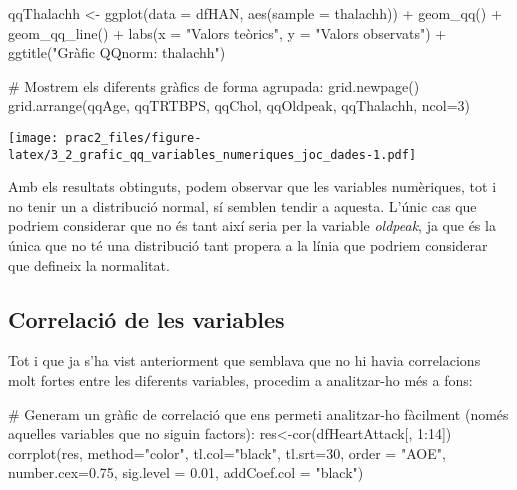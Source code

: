 \documentclass[
]{article}
\newenvironment{Shaded}{\begin{snugshade}}{\end{snugshade}}
\newcommand{\AttributeTok}[1]{\textcolor[rgb]{0.80,0.80,0.80}{#1}}
\newcommand{\CommentTok}[1]{\textcolor[rgb]{0.50,0.62,0.50}{#1}}
\newcommand{\DecValTok}[1]{\textcolor[rgb]{0.86,0.86,0.80}{#1}}
\newcommand{\FloatTok}[1]{\textcolor[rgb]{0.75,0.75,0.82}{#1}}
\newcommand{\FunctionTok}[1]{\textcolor[rgb]{0.94,0.94,0.56}{#1}}
\newcommand{\NormalTok}[1]{\textcolor[rgb]{0.80,0.80,0.80}{#1}}
\newcommand{\OtherTok}[1]{\textcolor[rgb]{0.94,0.94,0.56}{#1}}
\newcommand{\SpecialCharTok}[1]{\textcolor[rgb]{0.86,0.64,0.64}{#1}}
\newcommand{\StringTok}[1]{\textcolor[rgb]{0.80,0.58,0.58}{#1}}
\begin{document}
\begin{Shaded}
\begin{Highlighting}[]
\NormalTok{qqThalachh }\OtherTok{\textless{}{-}} \FunctionTok{ggplot}\NormalTok{(}\AttributeTok{data =}\NormalTok{ dfHAN, }\FunctionTok{aes}\NormalTok{(}\AttributeTok{sample =}\NormalTok{ thalachh)) }\SpecialCharTok{+}
  \FunctionTok{geom\_qq}\NormalTok{() }\SpecialCharTok{+}
  \FunctionTok{geom\_qq\_line}\NormalTok{() }\SpecialCharTok{+}
  \FunctionTok{labs}\NormalTok{(}\AttributeTok{x =} \StringTok{"Valors teòrics"}\NormalTok{, }\AttributeTok{y =} \StringTok{"Valors observats"}\NormalTok{) }\SpecialCharTok{+}
  \FunctionTok{ggtitle}\NormalTok{(}\StringTok{"Gràfic QQnorm: \textquotesingle{}thalachh\textquotesingle{}"}\NormalTok{)}

\CommentTok{\# Mostrem els diferents gràfics de forma agrupada:}
\FunctionTok{grid.newpage}\NormalTok{()}
\FunctionTok{grid.arrange}\NormalTok{(qqAge, qqTRTBPS, qqChol, qqOldpeak, qqThalachh, }\AttributeTok{ncol=}\DecValTok{3}\NormalTok{)}
\end{Highlighting}
\end{Shaded}

\texttt{[image: prac2\_files/figure-latex/3\_2\_grafic\_qq\_variables\_numeriques\_joc\_dades-1.pdf]}

Amb els resultats obtinguts, podem observar que les variables
numèriques, tot i no tenir un a distribució normal, sí semblen tendir a
aquesta. L'únic cas que podriem considerar que no és tant així seria per
la variable \emph{oldpeak}, ja que és la única que no té una distribució
tant propera a la línia que podriem considerar que defineix la
normalitat.

\hypertarget{correlaciuxf3-de-les-variables}{%
\subsection{Correlació de les
variables}\label{correlaciuxf3-de-les-variables}}

Tot i que ja s'ha vist anteriorment que semblava que no hi havia
correlacions molt fortes entre les diferents variables, procedim a
analitzar-ho més a fons:

\begin{Shaded}
\begin{Highlighting}[]
\CommentTok{\# Generam un gràfic de correlació que ens permeti analitzar{-}ho fàcilment (només aquelles variables que no siguin factors):}
\NormalTok{res}\OtherTok{\textless{}{-}}\FunctionTok{cor}\NormalTok{(dfHeartAttack[, }\DecValTok{1}\SpecialCharTok{:}\DecValTok{14}\NormalTok{])}
\FunctionTok{corrplot}\NormalTok{(res, }\AttributeTok{method=}\StringTok{"color"}\NormalTok{, }\AttributeTok{tl.col=}\StringTok{"black"}\NormalTok{, }\AttributeTok{tl.srt=}\DecValTok{30}\NormalTok{, }\AttributeTok{order =} \StringTok{"AOE"}\NormalTok{, }\AttributeTok{number.cex=}\FloatTok{0.75}\NormalTok{, }\AttributeTok{sig.level =} \FloatTok{0.01}\NormalTok{, }\AttributeTok{addCoef.col =} \StringTok{"black"}\NormalTok{)}
\end{Highlighting}
\end{Shaded}
\end{document}
